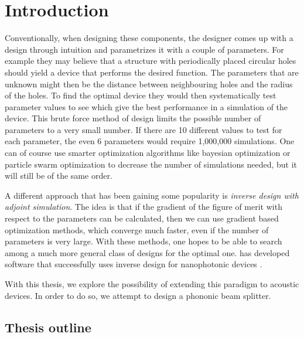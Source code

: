 \chapter{Introduction}


Conventionally, when designing these components, the designer comes up with a
design through intuition and parametrizes it with a couple of parameters.
For example they may believe that a structure with periodically placed circular
holes should yield a device that performs the desired function.
The parameters that are unknown might then be the distance between neighbouring
holes and the radius of the holes.
To find the optimal device they would then systematically test parameter values
to see which give the best performance in a simulation of the device.
This brute force method of design limits the possible number of parameters to a
very small number.
If there are 10 different values to test for each parameter, the even 6
parameters would require 1,000,000 simulations.
One can of course use smarter optimization algorithms like bayesian optimization
or particle swarm optimization
to decrease the number of simulations needed, but it will still be of the same
order.

A different approach that has been gaining some popularity is
\emph{inverse design with adjoint simulation}.
The idea is that if the gradient of the figure of merit
with respect to the parameters can be calculated, then we can use gradient based
optimization methods, which converge much faster, even if the number of
parameters is very large. With these methods, one hopes to be able to search
among a much more general class of designs for the optimal one.
\citeauthor{spins2019} has developed software that successfully uses inverse design for
nanophotonic devices \cite{spins2019}.

With this thesis, we explore the possibility of extending this paradigm to
acoustic devices. In order to do so, we attempt to design a phononic beam
splitter.

\section{Thesis outline}
